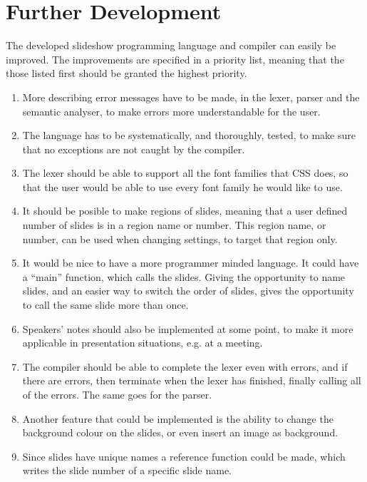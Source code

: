 \chapter{Further Development}
\label{sec:furtherdev}
The developed slideshow programming language and compiler can easily be improved. The improvements are specified in a priority list, meaning that the those listed first should be granted the highest priority.

\begin{enumerate}
	\item More describing error messages have to be made, in the lexer, parser and the semantic analyser, to make errors more understandable for the user.
	\item The language has to be systematically, and thoroughly, tested, to make sure that no exceptions are not caught by the compiler.
	\item The lexer should be able to support all the font families that CSS does, so that the user would be able to use every font family he would like to use.
	\item It should be posible to make regions of slides, meaning that a user defined number of slides is in a region name or number. This region name, or number, can be used when changing settings, to target that region only.
	\item It would be nice to have a more programmer minded language. It could have a ``main'' function, which calls the slides. Giving the opportunity to name slides, and an easier way to switch the order of slides, gives the opportunity to call the same slide more than once.
	\item Speakers' notes should also be implemented at some point, to make it more applicable in presentation situations, e.g. at a meeting.
	\item The compiler should be able to complete the lexer even with errors, and if there are errors, then terminate when the lexer has finished, finally calling all of the errors. The same goes for the parser.
	\item Another feature that could be implemented is the ability to change the background colour on the slides, or even insert an image as background.
	\item Since slides have unique names a reference function could be made, which writes the slide number of a specific slide name.
\end{enumerate}